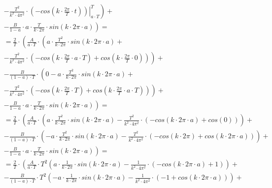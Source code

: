 \begin{task}
\begin{align*}
&- \left. \left. \frac{T^2}{k^2 \cdot 4\pi^2} \cdot \left. \left(-cos\left( k \cdot \frac{2\pi}{T} \cdot t\right) \right)\right|_{a \cdot T}^{T}  \right)\right. +\\
&-\left. \frac{B}{1-a}\cdot a \cdot \frac{T}{k \cdot 2\pi} \cdot sin\left(k \cdot 2\pi \cdot a\right) \right)=\\
&=\frac{2}{T}\cdot\left( \frac{A}{a \cdot T} \cdot \left( a \cdot \frac{T^2}{k \cdot 2\pi} \cdot sin\left( k \cdot 2\pi \cdot a\right) \right.\right.+ \\
&- \left. \left. \frac{T^2}{k^2 \cdot 4\pi^2} \cdot \left(-cos\left(k \cdot \frac{2\pi}{T} \cdot a \cdot T\right) + cos\left(k \cdot \frac{2\pi}{T} \cdot 0\right) \right) \right) \right. + \\
&-\left.\frac{B}{\left(1-a\right)\cdot T}\cdot \left( 0 - a \cdot \frac{T^2}{k \cdot 2\pi} \cdot sin\left( k \cdot 2\pi \cdot a \right) \right. \right.+ \\
&- \left. \left. \frac{T^2}{k^2 \cdot 4\pi^2} \cdot \left(-cos\left( k \cdot \frac{2\pi}{T} \cdot T\right) + cos\left( k \cdot \frac{2\pi}{T} \cdot a \cdot T\right) \right)  \right)\right. +\\
&-\left. \frac{B}{1-a}\cdot a \cdot \frac{T}{k \cdot 2\pi} \cdot sin\left(k \cdot 2\pi \cdot a\right) \right)=\\
&=\frac{2}{T}\cdot\left( \frac{A}{a \cdot T} \cdot \left( a \cdot \frac{T^2}{k \cdot 2\pi} \cdot sin\left( k \cdot 2\pi \cdot a\right) - \frac{T^2}{k^2 \cdot 4\pi^2} \cdot \left(-cos\left(k \cdot 2\pi \cdot a \right) + cos\left(0\right) \right) \right) \right. + \\
&-\left.\frac{B}{\left(1-a\right)\cdot T}\cdot \left( - a \cdot \frac{T^2}{k \cdot 2\pi} \cdot sin\left( k \cdot 2\pi \cdot a \right) - \frac{T^2}{k^2 \cdot 4\pi^2} \cdot \left(-cos\left( k \cdot 2\pi\right) + cos\left( k \cdot 2\pi \cdot a \right) \right)  \right)\right. +\\
&-\left. \frac{B}{1-a}\cdot a \cdot \frac{T}{k \cdot 2\pi} \cdot sin\left(k \cdot 2\pi \cdot a\right) \right)=\\
&=\frac{2}{T}\cdot\left( \frac{A}{a \cdot T} \cdot T^2 \left( a \cdot \frac{1}{k \cdot 2\pi} \cdot sin\left( k \cdot 2\pi \cdot a\right) - \frac{1}{k^2 \cdot 4\pi^2} \cdot \left(-cos\left(k \cdot 2\pi \cdot a \right) + 1 \right) \right) \right. + \\
&-\left.\frac{B}{\left(1-a\right)\cdot T}\cdot T^2 \left( - a \cdot \frac{1}{k \cdot 2\pi} \cdot sin\left( k \cdot 2\pi \cdot a \right) - \frac{1}{k^2 \cdot 4\pi^2} \cdot \left(-1 + cos\left( k \cdot 2\pi \cdot a \right) \right)  \right)\right. +\\

\end{align*}
\end{task}
